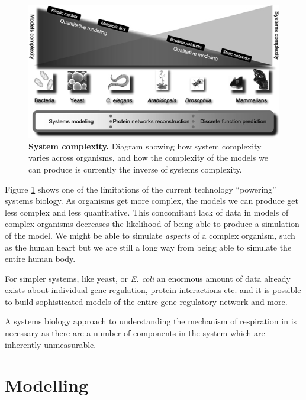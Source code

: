 \begin{figure}[tbp]
 \centering
 \includegraphics[width=14cm]{./01-introduction/data/msb4100080-f1.png}
\caption[{System complexity.}]{{\bf System complexity.} Diagram showing how system complexity varies across organisms, and how the complexity of the models we can produce is currently the inverse of systems complexity. \citet{Kahlem2006}
\label{fig:systems-power}}
\end{figure}

Figure \ref{fig:systems-power} shows one of the limitations of the current technology ``powering'' systems biology. As organisms get more complex, the models we can produce get less complex and less quantitative\cite{Kahlem2006}. This concomitant lack of data in models of complex organisms decreases the likelihood of being able to produce a simulation of the model. We might be able to simulate \textit{aspects} of a complex organism, such as the human heart\cite{Crampin2004} but we are still a long way from being able to simulate the entire human body.

For simpler systems, like yeast, or \textit{E. coli} an enormous amount of data already exists about individual gene regulation, protein interactions etc. and it is possible to build sophisticated models of the entire gene regulatory network and more\cite{Barabasi2004,Peercy2006}.

A systems biology approach to understanding the mechanism of respiration in \Nsm{} is necessary as there are a number of components in the system which are inherently unmeasurable.

\section{Modelling}


